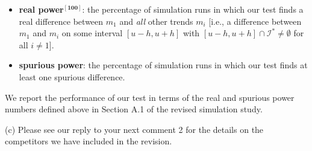 \documentclass[a4paper,12pt]{article}
\begin{document}
\begin{enumerate}[label=\arabic*.,leftmargin=0.6cm]
\begin{itemize}
\item \textbf{real power$^{\boldsymbol{[100]}}$}: the percentage of simulation runs in which our test finds a real difference between $m_1$ and \textit{all} other trends $m_i$ [i.e., a difference between $m_1$ and $m_i$ on some interval $[u-h, u+h]$ with $[u-h, u+h] \cap \mathcal{I}^* \neq \emptyset$ for all $i \ne 1$]. 
\item \textbf{spurious power}: the percentage of simulation runs in which our test finds at least one spurious difference.  
\end{itemize}
We report the performance of our test in terms of the real and spurious power numbers defined above in Section A.1 of the revised simulation study. 

(c) Please see our reply to your next comment 2 for the details on the competitors we have included in the revision. 


\end{enumerate}
\end{document}
